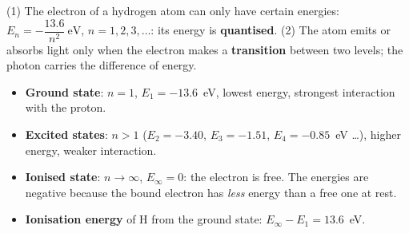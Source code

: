 \begin{concept}
(1) The electron of a hydrogen atom can only have certain energies:
$\boxed{E_n = -\dfrac{13.6}{n^2}\ \text{eV}}$, $n = 1, 2, 3, \dots$: its energy is \textbf{quantised}.
(2) The atom emits or absorbs light only when the electron makes a \textbf{transition} between two
levels; the photon carries the difference of energy.
\end{concept}
\begin{itemize}
  \item \textbf{Ground state}: $n = 1$, $E_1 = -13.6$~eV, lowest energy, strongest interaction with the proton.
  \item \textbf{Excited states}: $n > 1$ ($E_2 = -3.40$, $E_3 = -1.51$, $E_4 = -0.85$~eV \dots), higher
        energy, weaker interaction.
  \item \textbf{Ionised state}: $n\to\infty$, $E_\infty = 0$: the electron is free. The energies are
        negative because the bound electron has \emph{less} energy than a free one at rest.
  \item \textbf{Ionisation energy} of H from the ground state: $E_\infty - E_1 = 13.6$~eV.
\end{itemize}
